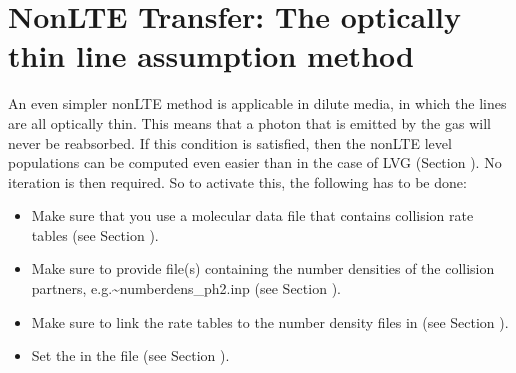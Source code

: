 \documentclass[letterpaper,10pt,english]{sphinxmanual}
\begin{document}
\section{Non\sphinxhyphen{}LTE Transfer: The optically thin line assumption method}
\label{\detokenize{lineradtrans:non-lte-transfer-the-optically-thin-line-assumption-method}}\label{\detokenize{lineradtrans:sec-optthinpop}}
An even simpler non\sphinxhyphen{}LTE method is applicable in  dilute
media, in which the lines are all optically thin. This means that
a photon that is emitted by the gas will never be reabsorbed.
If this condition is satisfied, then the non\sphinxhyphen{}LTE level populations
can be computed even easier than in the case of LVG (Section
{\hyperref[\detokenize{lineradtrans:sec-lvg}]{}}). No iteration is then required. So to activate
this, the following has to be done:
\begin{itemize}
\item {} 
Make sure that you use a molecular data file that contains
collision rate tables (see Section {\hyperref[\detokenize{lineradtrans:sec-molecule-xxx-inp}]{}}).

\item {} 
Make sure to provide file(s) containing the number densities
of the collision partners, e.g.\textasciitilde{}\textasciigrave{}\textasciigrave{}numberdens\_p\sphinxhyphen{}h2.inp\textasciigrave{}\textasciigrave{}
(see Section {\hyperref[\detokenize{lineradtrans:sec-collpartner}]{}}).

\item {} 
Make sure to link the rate tables to the number density
files in  (see Section {\hyperref[\detokenize{lineradtrans:sec-line-dot-inp}]{}}).

\item {} 
Set the  in the 
file (see Section {\hyperref[\detokenize{inputoutputfiles:sec-radmc-inp}]{}}).

\end{itemize}
\end{document}
